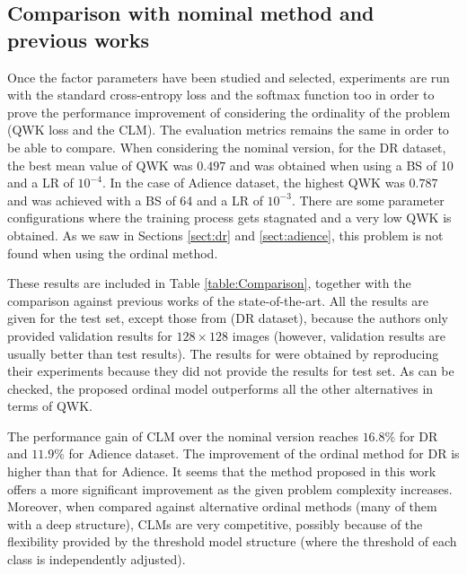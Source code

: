 \documentclass[journal]{IEEEtran}
\begin{document}
	\subsection{Comparison with nominal method and previous works}
	\label{sect:NominalComparison}
	Once the factor parameters have been studied and selected, experiments are run with the standard cross-entropy loss and the softmax function too in order to prove the performance improvement of considering the ordinality of the problem (QWK loss and the CLM). The evaluation metrics remains the same in order to be able to compare. When considering the nominal version, for the DR dataset, the best mean value of QWK was $0.497$ and was obtained when using a BS of 10 and a LR of $10^{-4}$. In the case of Adience dataset, the highest QWK was $0.787$ and was achieved with a BS of 64 and a LR of $10^{-3}$. There are some parameter configurations where the training process gets stagnated and a very low QWK is obtained. As we saw in Sections \ref{sect:dr} and \ref{sect:adience}, this problem is not found when using the ordinal method. 

	These results are included in Table \ref{table:Comparison}, together with the comparison against previous works of the state-of-the-art. All the results are given for the test set, except those from \cite{de2018weighted} (DR dataset), because the authors only provided validation results for $128\times 128$ images (however, validation results are usually better than test results). The results for \cite{beckham2017unimodal} were obtained by reproducing their experiments because they did not provide the results for test set. As can be checked, the proposed ordinal model outperforms all the other alternatives in terms of QWK. 
	
	The performance gain of CLM over the nominal version reaches $16.8\%$ for DR and $11.9\%$ for Adience dataset. The improvement of the ordinal method for DR is higher than that for Adience. It seems that the method proposed in this work offers a more significant improvement as the given problem complexity increases. Moreover, when compared against alternative ordinal methods (many of them with a deep structure), CLMs are very competitive, possibly because of the flexibility provided by the threshold model structure (where the threshold of each class is independently adjusted).
\end{document}
